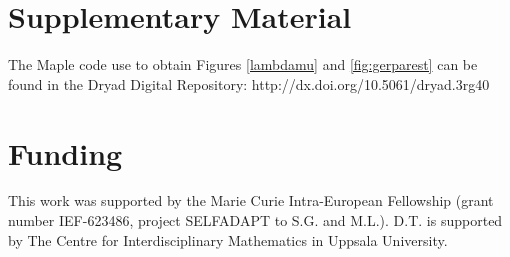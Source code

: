 \documentclass[a4paper,11pt]{article}
\theoremstyle{plain}
\theoremstyle{definition}
\numberwithin{equation}{section}
\begin{document}
\section*{Supplementary Material}
The Maple code use to obtain Figures \ref{lambdamu} and \ref{fig:gerparest}
can be found in the Dryad Digital Repository: 
http://dx.doi.org/10.5061/dryad.3rg40



\section*{Funding}

This work was supported by the Marie Curie Intra-European Fellowship 
(grant number IEF-623486, project SELFADAPT to S.G. and M.L.). D.T. is 
supported by The Centre for Interdisciplinary Mathematics in 
Uppsala University. 
\end{document}
